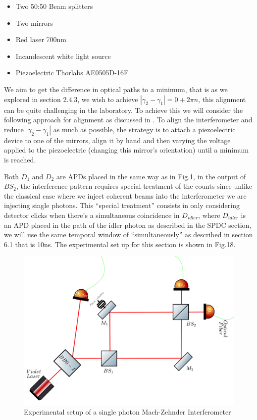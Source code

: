 \documentclass[12pt]{article}
\begin{document}
\begin{itemize}
\item Two 50:50 Beam splitters
\item Two mirrors
\item Red laser 700nm
\item Incandescent white light source
\item Piezoelectric Thorlabs AE0505D-16F
\end{itemize}

We aim to get the difference in optical paths to a minimum, that is as we explored in section 2.4.3, we wish to achieve $|\gamma_{2}-\gamma_{1}|=0+2\pi n$, this alignment can be quite challenging in the laboratory. To achieve this we will consider the following approach for alignment as discussed in \cite{zuri}. To align the interferometer and reduce $|\gamma_{2}-\gamma_{1}|$ as much as possible, the strategy is to attach a piezoelectric device to one of the mirrors, align it by hand and then varying the voltage applied to the piezoelectric (changing this mirror's orientation) until a minimum is reached.

Both $D_{1}$ and $D_{2}$ are APDs placed in the same way as in Fig.1, in the output of  $BS_{2}$, the interference pattern requires special treatment of the counts since unlike the classical case where we inject coherent beams into the interferometer we are injecting single photons. This ``special treatment'' consists in only considering detector clicks when there's a simultaneous coincidence in $D_{idler}$, where $D_{idler}$ is an APD placed in the path of the idler photon as described in the SPDC section, we will use the same temporal window of ``simultaneously'' as described in section 6.1 that is 10ns. The experimental set up for this section is shown in Fig.18.


\begin{figure}[!htb]
\centering
\includegraphics[width=\linewidth]{images/machzehnder_single.png}
\caption{Experimental setup of a single photon Mach-Zehnder Interferometer}
\label{fig:BS2}
\end{figure}
\end{document}
